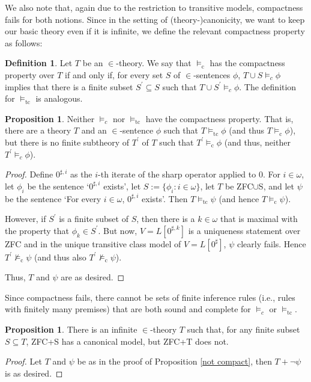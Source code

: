 \documentclass[a4paper,12pt]{amsart}
\theoremstyle{definition}
\newtheorem{prop}[fact]{Proposition}
\newtheorem{defini}[fact]{Definition}
\begin{document}
We also note that, again due to the restriction to transitive models, compactness fails for both notions. Since in the setting of (theory-)canonicity, we want to keep our basic theory even if it is infinite, we define the relevant compactness property as follows:

\begin{defini}
Let $T$ be an $\in$-theory. We say that $\models_{\text{c}}$ has the compactness property over $T$ if and only if, for every set $S$ of $\in$-sentences $\phi$, $T\cup S\models_{c}\phi$ implies that there is a finite subset $S^{\prime}\subseteq S$ such that $T\cup S^{\prime}\models_{c}\phi$. The definition for $\models_{\text{tc}}$ is analogous.
\end{defini}

\begin{prop}{\label{not compact}}
Neither $\models_{c}$ nor $\models_{\text{tc}}$ have the compactness property. That is, there are a theory $T$ and an $\in$-sentence $\phi$ such that $T\models_{\text{tc}}\phi$ (and thus $T\models_{\text{c}}\phi$), but there is no finite subtheory of $T^{\prime}$ of $T$ such that $T^{\prime}\models_{\text{c}}\phi$ (and thus, neither $T^{\prime}\models_{c}\phi$). 
\end{prop}
\begin{proof}
Define $0^{\sharp,i}$ as the $i$-th iterate of the sharp operator applied to $0$. 
For $i\in\omega$, let $\phi_{i}$ be the sentence `$0^{\sharp,i}$ exists',  let $S:=\{\phi_{i}:i\in\omega\}$, let $T$ be ZFC$\cup $S, and let $\psi$ be the sentence `For every $i\in\omega$, $0^{\sharp,i}$ exists'. Then $T\models_{\text{tc}}\psi$ (and hence $T\models_{\text{c}}\psi$). 

However, if $S^{\prime}$ is a finite subset of $S$, then there is a $k\in\omega$ that is maximal with the property that $\phi_{k}\in S^{\prime}$. But now, $V=L[0^{\sharp,k}]$ is a uniqueness statement over ZFC and in the unique transitive class model of $V=L[0^{\sharp}]$, $\psi$ clearly fails.
Hence $T^{\prime}\not\models_{\text{c}}\psi$ (and thus also $T^{\prime}\not\models_{\text{c}}\psi$). 

Thus, $T$ and $\psi$ are as desired.
\end{proof}

Since compactness fails, there cannot be sets of finite inference rules (i.e., rules with finitely many premises) that are both sound and complete for $\models_{c}$ or $\models_{\text{tc}}$.




\begin{prop}{\label{not compact 2}}
There is an infinite $\in$-theory $T$ such that, for any finite subset $S\subseteq T$, ZFC+S has a canonical model, but ZFC+T does not.
\end{prop}
\begin{proof}
Let $T$ and $\psi$ be as in the proof of Proposition \ref{not compact}, then $T+\neg\psi$ is as desired.
\end{proof}
\end{document}
